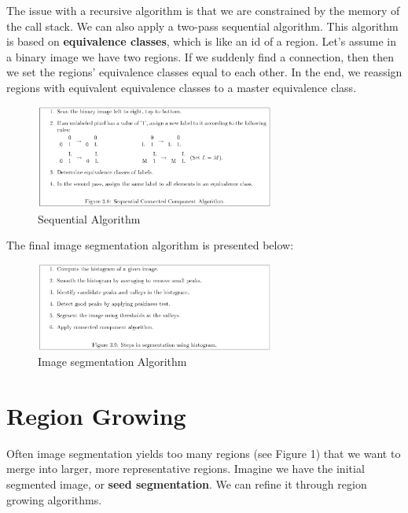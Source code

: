 \documentclass{article}
\begin{document}
\noindent
\noindent
The issue with a recursive algorithm is that we are constrained by the memory of the call stack. We can also apply a two-pass sequential algorithm. This algorithm is based on \textbf{equivalence classes}, which is like an id of a region. Let's assume in a binary image we have two regions. If we suddenly find a connection, then then we set the regions' equivalence classes equal to each other. In the end, we reassign regions with equivalent equivalence classes to a master equivalence class. 

\begin{figure}[!htb]
    \begin{center}
        \includegraphics[width=0.7\textwidth]{L5F6.png}
        \vspace{-20pt}
    \end{center}
    \caption{Sequential Algorithm}
\end{figure}

\noindent
The final image segmentation algorithm is presented below:

\begin{figure}[!htb]
    \begin{center}
        \includegraphics[width=0.7\textwidth]{L5F7.png}
        \vspace{-20pt}
    \end{center}
    \caption{Image segmentation Algorithm}
\end{figure}

\noindent

\section{Region Growing}
Often image segmentation yields too many regions (see Figure 1) that we want to merge into larger, more representative regions. Imagine we have the initial segmented image, or \textbf{seed segmentation}. We can refine it through region growing algorithms.
\end{document}
